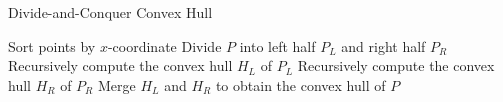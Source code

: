 \begin{algorithm}[H]
\SetAlgoLined
\caption{Divide-and-Conquer Convex Hull}

Sort points by $x$-coordinate\;
Divide $P$ into left half $P_L$ and right half $P_R$\;
Recursively compute the convex hull $H_L$ of $P_L$\;
Recursively compute the convex hull $H_R$ of $P_R$\;
Merge $H_L$ and $H_R$ to obtain the convex hull of $P$\;
\end{algorithm}